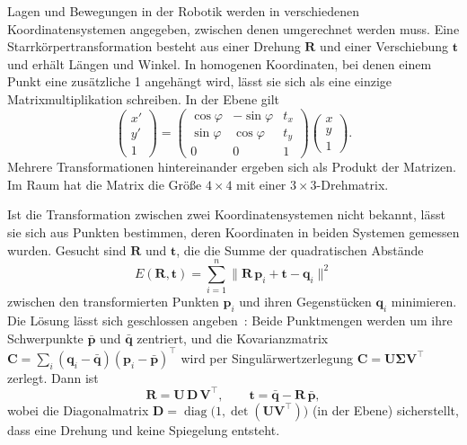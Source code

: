 Lagen und Bewegungen in der Robotik werden in verschiedenen Koordinatensystemen angegeben,
zwischen denen umgerechnet werden muss. Eine Starrkörpertransformation besteht aus einer
Drehung $\mathbf{R}$ und einer Verschiebung $\mathbf{t}$ und erhält Längen und Winkel. In
homogenen Koordinaten, bei denen einem Punkt eine zusätzliche 1 angehängt wird, lässt sie sich
als eine einzige Matrixmultiplikation schreiben. In der Ebene gilt
\begin{equation}
  \begin{pmatrix} x' \\ y' \\ 1 \end{pmatrix}
  = \begin{pmatrix} \cos\varphi & -\sin\varphi & t_x \\
                    \sin\varphi & \cos\varphi & t_y \\
                    0 & 0 & 1 \end{pmatrix}
    \begin{pmatrix} x \\ y \\ 1 \end{pmatrix} .
\end{equation}
Mehrere Transformationen hintereinander ergeben sich als Produkt der Matrizen. Im Raum hat die
Matrix die Größe $4 \times 4$ mit einer $3 \times 3$-Drehmatrix.

Ist die Transformation zwischen zwei Koordinatensystemen nicht bekannt, lässt sie sich aus
Punkten bestimmen, deren Koordinaten in beiden Systemen gemessen wurden. Gesucht sind
$\mathbf{R}$ und $\mathbf{t}$, die die Summe der quadratischen Abstände
\begin{equation}
  E(\mathbf{R}, \mathbf{t}) = \sum_{i=1}^{n} \bigl\| \mathbf{R}\,\mathbf{p}_i + \mathbf{t} - \mathbf{q}_i \bigr\|^2
\end{equation}
zwischen den transformierten Punkten $\mathbf{p}_i$ und ihren Gegenstücken $\mathbf{q}_i$
minimieren. Die Lösung lässt sich geschlossen angeben~\cite{umeyama1991}: Beide Punktmengen
werden um ihre Schwerpunkte $\bar{\mathbf{p}}$ und $\bar{\mathbf{q}}$ zentriert, und die
Kovarianzmatrix $\mathbf{C} = \sum_i (\mathbf{q}_i - \bar{\mathbf{q}})(\mathbf{p}_i - \bar{\mathbf{p}})^\top$
wird per Singulärwertzerlegung $\mathbf{C} = \mathbf{U}\boldsymbol{\Sigma}\mathbf{V}^\top$
zerlegt. Dann ist
\begin{equation}
  \mathbf{R} = \mathbf{U}\,\mathbf{D}\,\mathbf{V}^\top, \qquad
  \mathbf{t} = \bar{\mathbf{q}} - \mathbf{R}\,\bar{\mathbf{p}},
\end{equation}
wobei die Diagonalmatrix $\mathbf{D} = \operatorname{diag}\bigl(1, \det(\mathbf{U}\mathbf{V}^\top)\bigr)$
(in der Ebene) sicherstellt, dass eine Drehung und keine Spiegelung entsteht.

